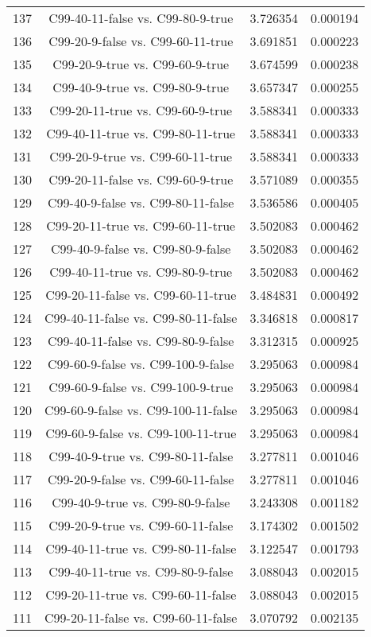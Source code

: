 \documentclass[a4paper,10pt]{article}
\begin{document}
\begin{landscape}
\begin{table}[!htp]
\begin{tabular}{cccc}
137&C99-40-11-false vs. C99-80-9-true&3.726354&0.000194\\
136&C99-20-9-false vs. C99-60-11-true&3.691851&0.000223\\
135&C99-20-9-true vs. C99-60-9-true&3.674599&0.000238\\
134&C99-40-9-true vs. C99-80-9-true&3.657347&0.000255\\
133&C99-20-11-true vs. C99-60-9-true&3.588341&0.000333\\
132&C99-40-11-true vs. C99-80-11-true&3.588341&0.000333\\
131&C99-20-9-true vs. C99-60-11-true&3.588341&0.000333\\
130&C99-20-11-false vs. C99-60-9-true&3.571089&0.000355\\
129&C99-40-9-false vs. C99-80-11-false&3.536586&0.000405\\
128&C99-20-11-true vs. C99-60-11-true&3.502083&0.000462\\
127&C99-40-9-false vs. C99-80-9-false&3.502083&0.000462\\
126&C99-40-11-true vs. C99-80-9-true&3.502083&0.000462\\
125&C99-20-11-false vs. C99-60-11-true&3.484831&0.000492\\
124&C99-40-11-false vs. C99-80-11-false&3.346818&0.000817\\
123&C99-40-11-false vs. C99-80-9-false&3.312315&0.000925\\
122&C99-60-9-false vs. C99-100-9-false&3.295063&0.000984\\
121&C99-60-9-false vs. C99-100-9-true&3.295063&0.000984\\
120&C99-60-9-false vs. C99-100-11-false&3.295063&0.000984\\
119&C99-60-9-false vs. C99-100-11-true&3.295063&0.000984\\
118&C99-40-9-true vs. C99-80-11-false&3.277811&0.001046\\
117&C99-20-9-false vs. C99-60-11-false&3.277811&0.001046\\
116&C99-40-9-true vs. C99-80-9-false&3.243308&0.001182\\
115&C99-20-9-true vs. C99-60-11-false&3.174302&0.001502\\
114&C99-40-11-true vs. C99-80-11-false&3.122547&0.001793\\
113&C99-40-11-true vs. C99-80-9-false&3.088043&0.002015\\
112&C99-20-11-true vs. C99-60-11-false&3.088043&0.002015\\
111&C99-20-11-false vs. C99-60-11-false&3.070792&0.002135\\

\end{tabular}
\end{table}
\end{landscape}
\end{document}
